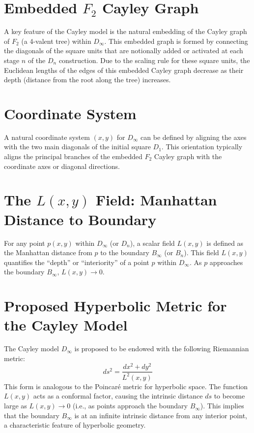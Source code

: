 \documentclass[12pt, a4paper]{article}
\begin{document}
\section{Embedded $F_2$ Cayley Graph}
A key feature of the Cayley model is the natural embedding of the Cayley graph of $F_2$ (a 4-valent tree) within $D_\infty$. This embedded graph is formed by connecting the diagonals of the square units that are notionally added or activated at each stage $n$ of the $D_n$ construction. Due to the scaling rule for these square units, the Euclidean lengths of the edges of this embedded Cayley graph decrease as their depth (distance from the root along the tree) increases.

\section{Coordinate System}
A natural coordinate system $(x,y)$ for $D_\infty$ can be defined by aligning the axes with the two main diagonals of the initial square $D_1$. This orientation typically aligns the principal branches of the embedded $F_2$ Cayley graph with the coordinate axes or diagonal directions.

\section{The $L(x,y)$ Field: Manhattan Distance to Boundary}
For any point $p(x,y)$ within $D_\infty$ (or $D_n$), a scalar field $L(x,y)$ is defined as the Manhattan distance from $p$ to the boundary $B_\infty$ (or $B_n$). This field $L(x,y)$ quantifies the ``depth'' or ``interiority'' of a point $p$ within $D_\infty$. As $p$ approaches the boundary $B_\infty$, $L(x,y) \to 0$.

\section{Proposed Hyperbolic Metric for the Cayley Model}
The Cayley model $D_\infty$ is proposed to be endowed with the following Riemannian metric:
\begin{equation}
ds^2 = \frac{dx^2 + dy^2}{L^2(x, y)}
\end{equation}
This form is analogous to the Poincaré metric for hyperbolic space. The function $L(x,y)$ acts as a conformal factor, causing the intrinsic distance $ds$ to become large as $L(x,y) \to 0$ (i.e., as points approach the boundary $B_\infty$). This implies that the boundary $B_\infty$ is at an infinite intrinsic distance from any interior point, a characteristic feature of hyperbolic geometry.
\end{document}
